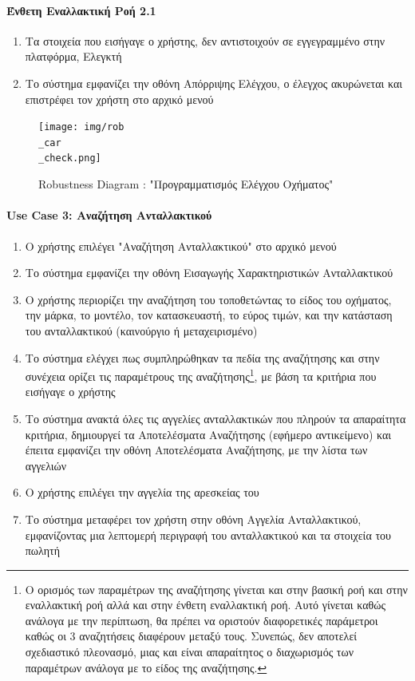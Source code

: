 \documentclass{../ol-softwaremanual}
\begin{document}
	\paragraph{Ένθετη Εναλλακτική Ροή 2.1}

	\begin{enumerate}
		\item Τα στοιχεία που εισήγαγε ο χρήστης, δεν αντιστοιχούν σε εγγεγραμμένο στην πλατφόρμα, Ελεγκτή
		\item Το σύστημα εμφανίζει την οθόνη Απόρριψης Ελέγχου, ο έλεγχος ακυρώνεται και επιστρέφει τον χρήστη στο αρχικό μενού
	\end{enumerate}
	
	
	\begin{figure}[htbp!]
		\texttt{[image: img/rob\\\_car\\\_check.png]}
		\caption{\en Robustness Diagram : "\gr Προγραμματισμός Ελέγχου Οχήματος\en"\gr}
	\end{figure}
	
	
	\newpage
	\centering
	
	\paragraph{\en Use Case 3: \gr Αναζήτηση Ανταλλακτικού}	
	
	\begin{enumerate}
		\item Ο χρήστης επιλέγει \en"\gr Αναζήτηση Ανταλλακτικού\en" \gr στο αρχικό μενού
		\item Το σύστημα εμφανίζει την οθόνη Εισαγωγής Χαρακτηριστικών Ανταλλακτικού
		\item Ο χρήστης περιορίζει την αναζήτηση του τοποθετώντας το είδος του οχήματος, την μάρκα, το μοντέλο, τον κατασκευαστή, το εύρος τιμών, και την κατάσταση του ανταλλακτικού (καινούργιο ή μεταχειρισμένο) 
		\item Το σύστημα ελέγχει πως συμπληρώθηκαν τα πεδία της αναζήτησης και στην συνέχεια ορίζει τις παραμέτρους της αναζήτησης\footnote[2]{Ο ορισμός των παραμέτρων της αναζήτησης γίνεται και στην βασική ροή και στην εναλλακτική ροή αλλά και στην ένθετη εναλλακτική ροή. Αυτό γίνεται καθώς ανάλογα με την περίπτωση, θα πρέπει να οριστούν διαφορετικές παράμετροι καθώς οι 3 αναζητήσεις διαφέρουν μεταξύ τους. Συνεπώς, δεν αποτελεί σχεδιαστικό πλεονασμό, μιας και είναι απαραίτητος ο διαχωρισμός των παραμέτρων ανάλογα με το είδος της αναζήτησης.}, με βάση τα κριτήρια που εισήγαγε ο χρήστης
		\item Το σύστημα ανακτά όλες τις αγγελίες ανταλλακτικών που πληρούν τα απαραίτητα κριτήρια, δημιουργεί τα Αποτελέσματα Αναζήτησης (εφήμερο αντικείμενο) και έπειτα εμφανίζει την οθόνη Αποτελέσματα Αναζήτησης, με την λίστα των αγγελιών
		\item Ο χρήστης επιλέγει την αγγελία της αρεσκείας του
		\item Το σύστημα μεταφέρει τον χρήστη στην οθόνη Αγγελία Ανταλλακτικού, εμφανίζοντας μια λεπτομερή περιγραφή του ανταλλακτικού και τα στοιχεία του πωλητή		
	\end{enumerate}
	
\end{document}
